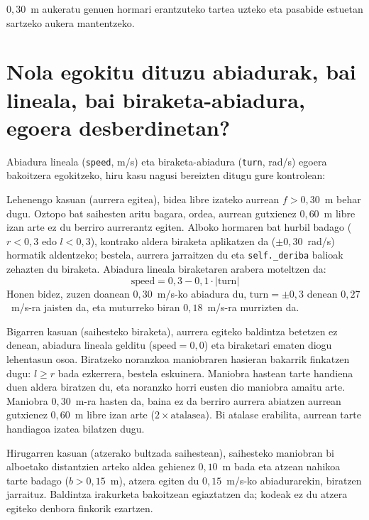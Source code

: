 $0{,}30$~m aukeratu genuen hormari erantzuteko tartea uzteko eta pasabide estuetan sartzeko aukera mantentzeko.

\section[Nola egokitu dituzu abiadurak egoera desberdinetan?][Abiaduren eta biraketen egokitzapena]{Nola egokitu dituzu abiadurak, bai lineala, bai biraketa-abiadura, egoera desberdinetan?}\label{sec:oz-mugimendua}

Abiadura lineala (\texttt{speed}, m/s) eta biraketa-abiadura (\texttt{turn}, rad/s) egoera bakoitzera egokitzeko, hiru kasu nagusi bereizten ditugu gure kontrolean:

Lehenengo kasuan (aurrera egitea), bidea libre izateko aurrean $f > 0{,}30$~m behar dugu. Oztopo bat saihesten aritu bagara, ordea, aurrean gutxienez $0{,}60$~m libre izan arte ez du berriro aurrerantz egiten. Alboko hormaren bat hurbil badago ($r < 0{,}3$ edo $l < 0{,}3$), kontrako aldera biraketa aplikatzen da ($\pm 0{,}30$~rad/s) hormatik aldentzeko; bestela, aurrera jarraitzen du eta \texttt{self.\_deriba} balioak zehazten du biraketa. Abiadura lineala biraketaren arabera moteltzen da:
\[
  \text{speed} = 0{,}3 - 0{,}1 \cdot |\text{turn}|
\]
Honen bidez, zuzen doanean $0{,}30$~m/s-ko abiadura du, $\text{turn} = \pm 0{,}3$ denean $0{,}27$~m/s-ra jaisten da, eta muturreko biran $0{,}18$~m/s-ra murrizten da.

Bigarren kasuan (saihesteko biraketa), aurrera egiteko baldintza betetzen ez denean, abiadura lineala gelditu ($\text{speed} = 0{,}0$) eta biraketari ematen diogu lehentasun osoa. Biratzeko noranzkoa maniobraren hasieran bakarrik finkatzen dugu: $l \ge r$ bada ezkerrera, bestela eskuinera. Maniobra hastean tarte handiena duen aldera biratzen du, eta noranzko horri eusten dio maniobra amaitu arte. Maniobra $0{,}30$~m-ra hasten da, baina ez da berriro aurrera abiatzen aurrean gutxienez $0{,}60$~m libre izan arte ($2 \times \text{atalasea}$). Bi atalase erabilita, aurrean tarte handiagoa izatea bilatzen dugu.

Hirugarren kasuan (atzerako bultzada saihestean), saihesteko maniobran bi alboetako distantzien arteko aldea gehienez $0{,}10$~m bada eta atzean nahikoa tarte badago ($b > 0{,}15$~m), atzera egiten du $0{,}15$~m/s-ko abiadurarekin, biratzen jarraituz. Baldintza irakurketa bakoitzean egiaztatzen da; kodeak ez du atzera egiteko denbora finkorik ezartzen.

